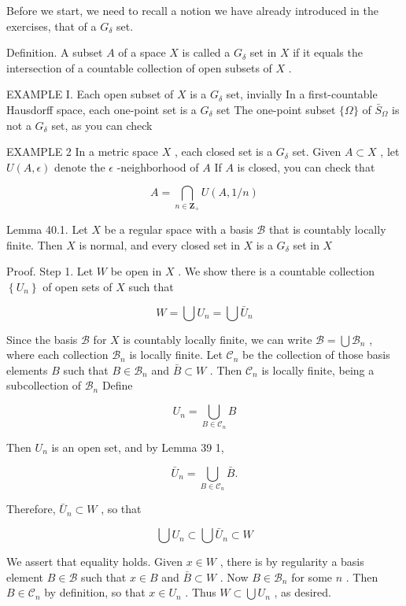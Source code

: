 Before we start, we need to recall a notion we have already introduced in the exercises, that of a \({G}_{\delta }\) set.

Definition. A subset \(A\) of a space \(X\) is called a \({G}_{\delta }\) set in \(X\) if it equals the intersection of a countable collection of open subsets of \(X\) .

EXAMPLE I. Each open subset of \(X\) is a \({G}_{\delta }\) set, invially In a first-countable Hausdorff space, each one-point set is a \({G}_{\delta }\) set The one-point subset \(\{ \Omega \}\) of \({\bar{S}}_{\Omega }\) is not a \({G}_{\delta }\) set, as you can check

EXAMPLE 2 In a metric space \(X\) , each closed set is a \({G}_{\delta }\) set. Given \(A \subset  X\) , let \(U\left( {A,\epsilon }\right)\) denote the \(\epsilon\) -neighborhood of \(A\) If \(A\) is closed, you can check that

\[
A = \mathop{\bigcap }\limits_{{n \in  {\mathbf{Z}}_{ + }}}U\left( {A,1/n}\right)
\]

Lemma 40.1. Let \(X\) be a regular space with a basis \(\mathcal{B}\) that is countably locally finite. Then \(X\) is normal, and every closed set in \(X\) is a \({G}_{\delta }\) set in \(X\)

Proof. Step 1. Let \(W\) be open in \(X\) . We show there is a countable collection \(\left\{  {U}_{n}\right\}\) of open sets of \(X\) such that

\[
W = \bigcup {U}_{n} = \bigcup {\bar{U}}_{n}
\]

Since the basis \(\mathcal{B}\) for \(X\) is countably locally finite, we can write \(\mathcal{B} = \bigcup {\mathcal{B}}_{n}\) , where each collection \({\mathcal{B}}_{n}\) is locally finite. Let \({\mathcal{C}}_{n}\) be the collection of those basis elements \(B\) such that \(B \in  {\mathcal{B}}_{n}\) and \(\bar{B} \subset  W\) . Then \({\mathcal{C}}_{n}\) is locally finite, being a subcollection of \({\mathcal{B}}_{n}\) Define

\[
{U}_{n} = \mathop{\bigcup }\limits_{{B \in  {\mathcal{C}}_{n}}}B
\]

Then \({U}_{n}\) is an open set, and by Lemma 39 1,

\[
{\bar{U}}_{n} = \mathop{\bigcup }\limits_{{B \in  {\mathcal{C}}_{n}}}\bar{B}.
\]

Therefore, \({\bar{U}}_{n} \subset  W\) , so that

\[
\bigcup {U}_{n} \subset  \bigcup {\bar{U}}_{n} \subset  W
\]

We assert that equality holds. Given \(x \in  W\) , there is by regularity a basis element \(B \in  \mathcal{B}\) such that \(x \in  B\) and \(\bar{B} \subset  W\) . Now \(B \in  {\mathcal{B}}_{n}\) for some \(n\) . Then \(B \in  {\mathcal{C}}_{n}\) by definition, so that \(x \in  {U}_{n}\) . Thus \(W \subset  \bigcup {U}_{n}\) , as desired.

